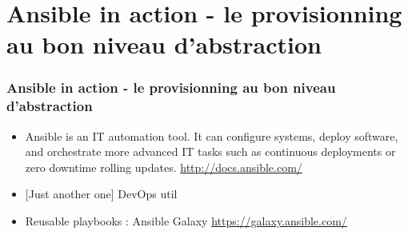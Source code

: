 \documentclass[presentation]{beamer}
\begin{document}
\section{Ansible in action - le provisionning au bon niveau d'abstraction}

\begin{frame}
\frametitle{Ansible in action - le provisionning au bon niveau d'abstraction}

\begin{itemize}
\item Ansible is an IT automation tool. It can configure systems, deploy software, and orchestrate more advanced IT tasks such as continuous deployments or zero downtime rolling updates.
\url{http://docs.ansible.com/}
\item {[Just another one]} DevOps util
\item Reusable playbooks : Ansible Galaxy
\url{https://galaxy.ansible.com/}
\end{itemize}

\end{frame}
\end{document}
